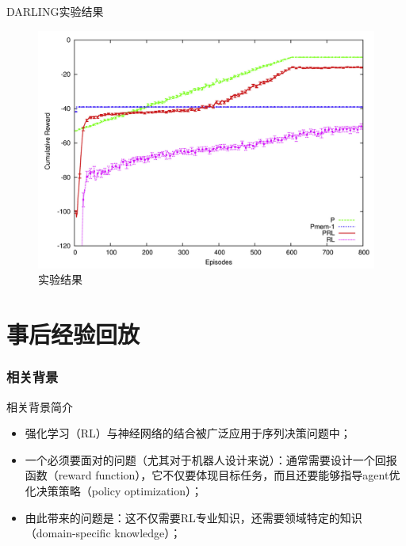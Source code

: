 \documentclass[10pt]{beamer}
\begin{document}
	\begin{frame}{DARLING}{实验结果}
		\begin{figure}
			\centering
			\includegraphics[width=0.6\linewidth]{pictures/darling-expr}
			\caption{实验结果}
			\label{fig:darling-expr}
		\end{figure}
	\end{frame}

	\part{事后经验回放}\label{part:her}
	
	\section{相关背景}
	
	\begin{frame}{相关背景}{简介}
		\begin{itemize}
			\item<2-> 强化学习（RL）与神经网络的结合被广泛应用于序列决策问题中；
			
			\item<3-> 一个必须要面对的问题（尤其对于机器人设计来说）：通常需要设计一个回报函数（reward function），它不仅要体现目标任务，而且还要能够指导agent优化决策策略（policy optimization）；
			
			\item<4-> 由此带来的问题是：这不仅需要RL专业知识，还需要领域特定的知识（domain-specific knowledge）；
			
		\end{itemize}
		
	\end{frame}
\end{document}
